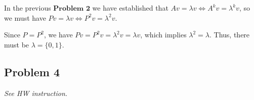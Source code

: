 \documentclass[11pt]{article}
\begin{document}
In the previous $\textbf{Problem 2}$ we have established that $Av = \lambda v \Longleftrightarrow A^k v = \lambda^k v$, so we must have $Pv = \lambda v \Longleftrightarrow P^2 v = \lambda^2 v$.

Since $P = P^2$, we have $Pv = P^2 v = \lambda ^2 v = \lambda v$, which implies $\lambda ^2 = \lambda$. Thus, there must be $\lambda = \{0, 1\}$.



\subsection*{Problem 4}
\textit{See HW instruction.}\newline
\end{document}
